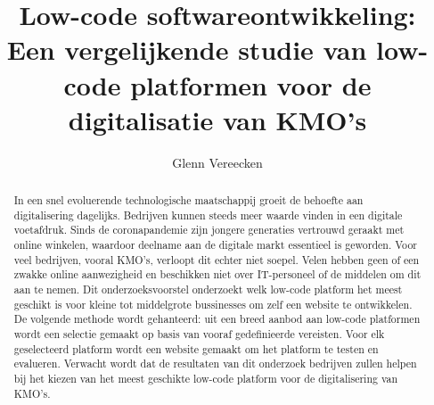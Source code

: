 \documentclass{hogent-article}
\title{Low-code softwareontwikkeling: Een vergelijkende studie van low-code platformen voor de digitalisatie van KMO’s}
\author{Glenn Vereecken}
\begin{document}
\begin{abstract}
  In een snel evoluerende technologische maatschappij groeit de behoefte aan digitalisering dagelijks. Bedrijven kunnen steeds meer waarde vinden in een digitale voetafdruk. Sinds de coronapandemie zijn jongere generaties vertrouwd geraakt met online winkelen, waardoor deelname aan de digitale markt essentieel is geworden. Voor veel bedrijven, vooral KMO’s, verloopt dit echter niet soepel. Velen hebben geen of een zwakke online aanwezigheid en beschikken niet over IT-personeel of de middelen om dit aan te nemen. Dit onderzoeksvoorstel onderzoekt welk low-code platform het meest geschikt is voor kleine tot middelgrote bussinesses om zelf een website te ontwikkelen. De volgende methode wordt gehanteerd: uit een breed aanbod aan low-code platformen wordt een selectie gemaakt op basis van vooraf gedefinieerde vereisten. Voor elk geselecteerd platform wordt een website gemaakt om het platform te testen en evalueren. Verwacht wordt dat de resultaten van dit onderzoek bedrijven zullen helpen bij het kiezen van het meest geschikte low-code platform voor de digitalisering van KMO’s.\end{abstract}

\tableofcontents



\printbibliography[heading=bibintoc]
\end{document}
